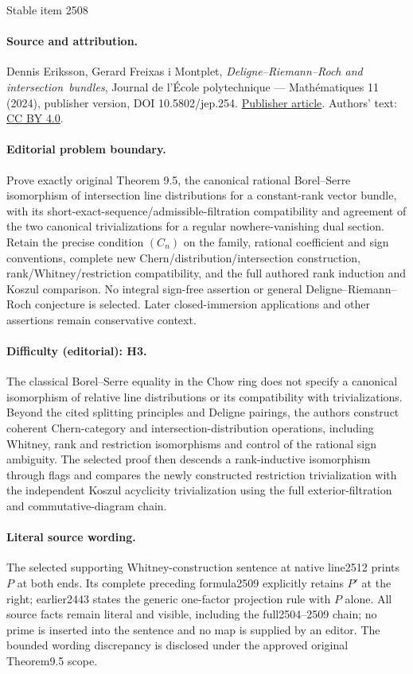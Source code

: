 \documentclass[11pt]{article}
\theoremstyle{plain}
\theoremstyle{definition}
\begin{document}
\begin{center}{\Large Stable item 2508}\end{center}
\paragraph{Source and attribution.}
Dennis Eriksson, Gerard Freixas i Montplet, \emph{Deligne–Riemann–Roch and intersection bundles}, Journal de l’École polytechnique — Mathématiques 11 (2024), publisher version, DOI 10.5802/jep.254. \href{https://jep.centre-mersenne.org/articles/10.5802/jep.254/}{Publisher article}. Authors' text: \href{https://creativecommons.org/licenses/by/4.0/}{CC BY 4.0}.
\paragraph{Editorial problem boundary.}
Prove exactly original Theorem 9.5, the canonical rational Borel--Serre isomorphism of intersection line distributions for a constant-rank vector bundle, with its short-exact-sequence/admissible-filtration compatibility and agreement of the two canonical trivializations for a regular nowhere-vanishing dual section. Retain the precise condition $(C_n)$ on the family, rational coefficient and sign conventions, complete new Chern/distribution/intersection construction, rank/Whitney/restriction compatibility, and the full authored rank induction and Koszul comparison. No integral sign-free assertion or general Deligne--Riemann--Roch conjecture is selected. Later closed-immersion applications and other assertions remain conservative context.
\paragraph{Difficulty (editorial): H3.}
The classical Borel--Serre equality in the Chow ring does not specify a canonical isomorphism of relative line distributions or its compatibility with trivializations. Beyond the cited splitting principles and Deligne pairings, the authors construct coherent Chern-category and intersection-distribution operations, including Whitney, rank and restriction isomorphisms and control of the rational sign ambiguity. The selected proof then descends a rank-inductive isomorphism through flags and compares the newly constructed restriction trivialization with the independent Koszul acyclicity trivialization using the full exterior-filtration and commutative-diagram chain.
\paragraph{Literal source wording.}
The selected supporting Whitney-construction sentence at native line2512 prints $P$ at both ends. Its complete preceding formula2509 explicitly retains $P'$ at the right; earlier2443 states the generic one-factor projection rule with $P$ alone. All source facts remain literal and visible, including the full2504--2509 chain; no prime is inserted into the sentence and no map is supplied by an editor. The bounded wording discrepancy is disclosed under the approved original Theorem9.5 scope.
\end{document}
